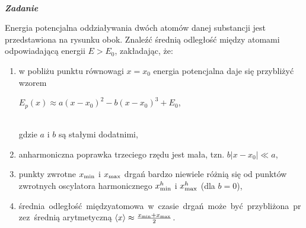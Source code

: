 \documentclass[11pt,a4paper]{article}
\newcounter{zadanie}\newcommand{\zadanie}[1][]{\addtocounter{zadanie}{1} ~\\  {\bf \emph{Zadanie \arabic{zadanie} #1 }} \\}
\begin{document}
\zadanie
\begin{figure}\vspace{-1cm}
\end{figure}
Energia potencjalna oddziaływania dwóch atomów danej substancji jest
przedstawiona na rysunku obok. Znaleźć średnią
odległość między atomami odpowiadającą energii $E>E_0$,
zakładając, że:
\begin{enumerate}
\item 
\parbox[t]{\linewidth}{
w pobliżu punktu równowagi $x=x_0$ energia 
potencjalna daje się przybliżyć wzorem\\[2mm] 
\centerline{$E_p(x) \approx a (x-x_0)^2 - b (x-x_0)^3 + E_0$,}\\[2mm]
gdzie $a$ i $b$ są stałymi dodatnimi,
}
\item anharmoniczna poprawka trzeciego rzędu jest mała, tzn. \mbox{$b |x-x_0|\ll a$},
\item punkty zwrotne $x_{\rm min}$ i $x_{\rm max}$
drgań bardzo niewiele różnią się od punktów zwrotnych
oscylatora harmonicznego $x^h_{\rm min}$ i $x^h_{\rm max}$ (dla $b=0$),
\item \mbox{średnia odległość międzyatomowa w czasie drgań może być
przybliżona przez średnią} arytmetyczną $\langle x\rangle \approx \frac{x_{\rm min}+x_{\rm max}}{2}$.
\end{enumerate}
\vskip 2pt
\end{document}

